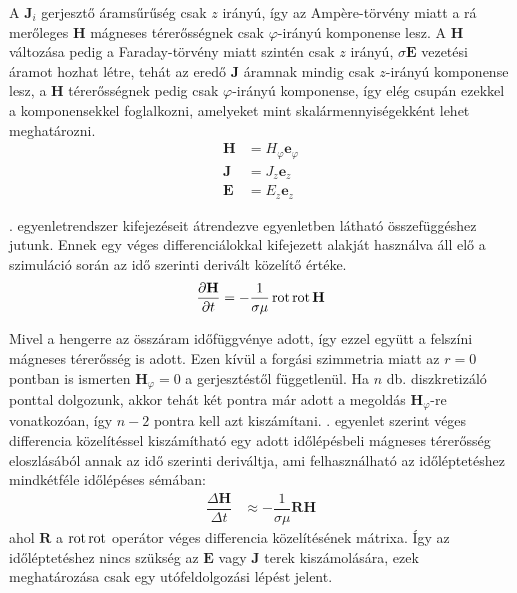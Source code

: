             A $\textbf{J}_i$ gerjesztő áramsűrűség csak $z$ irányú, így az Amp\`ere-törvény miatt a rá merőleges $\textbf{H}$ mágneses térerősségnek csak $\varphi$-irányú komponense lesz. A $\textbf{H}$ változása pedig a Faraday-törvény miatt szintén csak $z$ irányú, $\sigma\textbf{E}$ vezetési áramot hozhat létre, tehát az eredő $\textbf{J}$ áramnak mindig csak $z$-irányú komponense lesz, a $\textbf{H}$ térerősségnek pedig csak $\varphi$-irányú komponense, így elég csupán ezekkel a komponensekkel foglalkozni, amelyeket mint skalármennyiségekként lehet meghatározni.
            \begin{equation}\label{equ:komponens}
                \begin{aligned}
                    \textbf{H} &= H_{\varphi}\textbf{e}_\varphi\\
                    \textbf{J} &= J_{z}\textbf{e}_z\\
                    \textbf{E} &= E_{z}\textbf{e}_z
                \end{aligned}
            \end{equation}
            \par
            . egyenletrendszer kifejezéseit átrendezve  egyenletben látható összefüggéshez jutunk. Ennek egy véges differenciálokkal kifejezett alakját használva áll elő a szimuláció során az idő szerinti derivált közelítő értéke.
            \begin{equation}\label{equ:dhdt}
                \begin{aligned}
                    \dfrac{\partial \textbf{H}}{\partial t} &= -\dfrac{1}{\sigma\mu}\rot\rot\textbf{H}\\%
                \end{aligned}
            \end{equation}
            \par
            Mivel a hengerre az összáram időfüggvénye adott, így ezzel együtt a felszíni mágneses térerősség is adott. Ezen kívül a forgási szimmetria miatt az $r=0$ pontban is ismerten $\textbf{H}_{\varphi}=0$ a gerjesztéstől függetlenül. Ha $n$ db. diszkretizáló ponttal dolgozunk, akkor tehát két pontra már adott a megoldás $\textbf{H}_{\varphi}$-re vonatkozóan, így $n-2$ pontra kell azt kiszámítani. . egyenlet szerint véges differencia közelítéssel kiszámítható egy adott időlépésbeli mágneses térerősség eloszlásából annak az idő szerinti deriváltja, ami felhasználható az időléptetéshez mindkétféle időlépéses sémában:
            \begin{equation}\label{equ:dhdt}
                \begin{aligned}
                    \dfrac{\Delta \textbf{H}}{\Delta t} &\approx -\dfrac{1}{\sigma\mu}\mathbf{R}\textbf{H}
                \end{aligned}
            \end{equation}
            ahol $\mathbf{R}$ a $\operatorname{rot}\operatorname{rot}$ operátor véges differencia közelítésének mátrixa.
            Így az időléptetéshez nincs szükség az $\textbf{E}$ vagy $\textbf{J}$ terek kiszámolására, ezek meghatározása csak egy utófeldolgozási lépést jelent.
